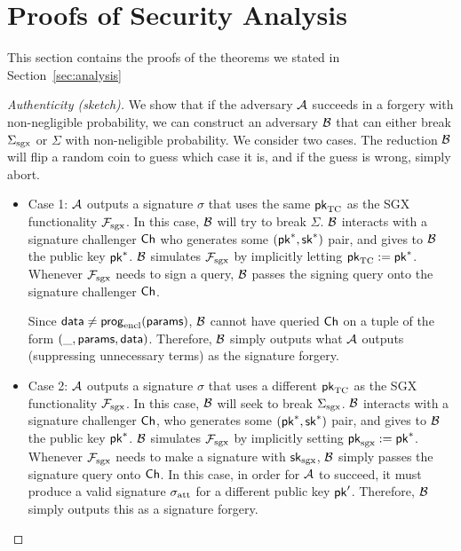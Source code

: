 
\section{Proofs of Security Analysis}
\label{sec:analysis-proofs}

This section contains the proofs of the theorems we stated in Section~\ref{sec:analysis}


\begin{proof}[Authenticity (sketch)]
We show that if the 
adversary $\mathcal{A}$ succeeds in a forgery with non-negligible probability,
we can construct an adversary $\mathcal{B}$ that can either
break ${\Sigma_{\textrm{sgx}}}$ or $\Sigma$ with non-neligible probability.
We consider two cases. 
The reduction $\mathcal{B}$ will flip a random coin to guess which
case it is, and if the guess is wrong, simply abort.
\begin{itemize}[leftmargin=5mm]
\item
Case 1: $\mathcal{A}$ outputs a signature $\sigma$ that uses the same  
${\sf pk}_{\textrm{TC}}$ as the SGX functionality $\mathcal{F}_{\textrm{sgx}}$.
In this case, $\mathcal{B}$ will try to break $\Sigma$. 
$\mathcal{B}$ interacts with a signature challenger ${\sf Ch}$ who generates
some $({\sf pk}^*, {\sf sk}^*)$ pair, and gives to $\mathcal{B}$ the public key
${\sf pk}^*$. $\mathcal{B}$ simulates 
$\mathcal{F}_{\textrm{sgx}}$ by implicitly letting ${\sf pk}_{\textrm{TC}} := {\sf pk}^*$.
Whenever $\mathcal{F}_{\textrm{sgx}}$ needs to sign a query, $\mathcal{B}$ passes the signing query
onto the signature challenger ${\sf Ch}$.

Since ${\sf data} \neq {\sf prog}_{\textrm{encl}}({\sf params})$,
$\mathcal{B}$ cannot have queried ${\sf Ch}$  
on a tuple of the form $(\_, {\sf params}, {\sf data})$. 
Therefore, $\mathcal{B}$ simply outputs 
what $\mathcal{A}$ 
outputs (suppressing unnecessary terms) as the signature forgery. 

\item
Case 2:
 $\mathcal{A}$ outputs a signature $\sigma$ that uses a different 
${\sf pk}_{\textrm{TC}}$ as the SGX functionality $\mathcal{F}_{\textrm{sgx}}$.
In this case, $\mathcal{B}$ will seek to break ${\Sigma_{\textrm{sgx}}}$.
$\mathcal{B}$ interacts with a signature challenger ${\sf Ch}$, who generates
some $({\sf pk}^*, {\sf sk}^*)$ pair, and gives to $\mathcal{B}$ the public key
${\sf pk}^*$. $\mathcal{B}$ simulates $\mathcal{F}_{\textrm{sgx}}$ by implicitly setting
${\sf pk}_{\mathrm{sgx}} := {\sf pk}^*$.
Whenever $\mathcal{F}_{\textrm{sgx}}$ needs to make a signature
with ${\sf sk}_{\mathrm{sgx}}$, 
$\mathcal{B}$ simply passes the signature query onto ${\sf Ch}$.
In this case, in order for $\mathcal{A}$ to succeed,
it must produce a valid signature ${\sigma_{\textrm{att}}}$ 
for a different public key ${\sf pk}'$.
Therefore, $\mathcal{B}$ simply outputs this as a signature forgery.
\end{itemize}
\end{proof}


